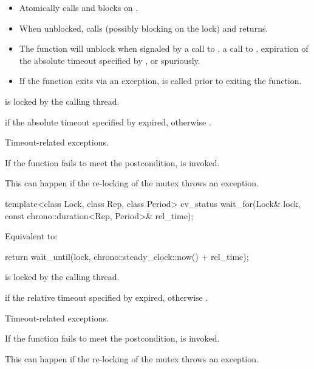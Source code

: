 \begin{itemdescr}
\pnum
\effects
\begin{itemize}
\item
{}%
Atomically calls  and blocks on .

\item
When unblocked, calls  (possibly blocking on the lock) and returns.

\item
The function will unblock when signaled by a call to , a call to ,
expiration of the absolute timeout specified by ,
or spuriously.

\item
If the function exits via an exception,  is called prior to exiting the function.
\end{itemize}

\pnum
\ensures
{} is locked by the calling thread.

\pnum
\returns
{} if
the absolute timeout specified by  expired,
otherwise .

\pnum
\throws
Timeout-related
exceptions.

\pnum
\remarks
If the function fails to meet the postcondition, 
is invoked.
\begin{note}
This can happen if the re-locking of the mutex throws an exception.
\end{note}
\end{itemdescr}

%
\begin{itemdecl}
template<class Lock, class Rep, class Period>
  cv_status wait_for(Lock& lock, const chrono::duration<Rep, Period>& rel_time);
\end{itemdecl}

\begin{itemdescr}
\pnum
\effects
Equivalent to:
\begin{codeblock}
return wait_until(lock, chrono::steady_clock::now() + rel_time);
\end{codeblock}

\pnum
\ensures
{} is locked by the calling thread.

\pnum
\returns
{} if
the relative timeout specified by  expired,
otherwise .

\pnum
\throws
Timeout-related
exceptions.

\pnum
\remarks
If the function fails to meet the postcondition, 
is invoked.
\begin{note}
This can happen if the re-locking of the mutex throws an exception.
\end{note}
\end{itemdescr}

